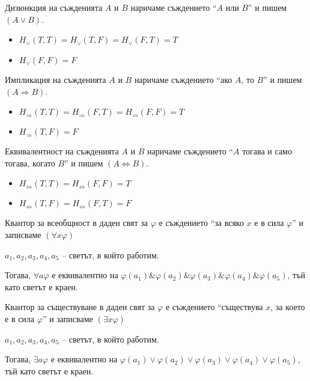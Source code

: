 \documentclass{article}
\begin{document}
\begin{mydef}[Дизюнкция]
Дизюнкция на съжденията $A$ и $B$ наричаме съждението  ``$A$ или $B$'' и пишем $(A \lor B)$.

\begin{itemize}
\item $H_\lor(T,T) = H_\lor(T,F) = H_\lor(F, T) = T$
\item $H_\lor(F,F) = F$
\end{itemize}
\end{mydef}

\begin{mydef}[Импликация]
Импликация на съжденията $A$ и $B$ наричаме съждението  ``ако $A$, то $B$'' и пишем $(A \Rightarrow B)$.

\begin{itemize}
\item $H_\Rightarrow(T,T) = H_\Rightarrow(F,T) = H_\Rightarrow(F, F) = T$
\item $H_\Rightarrow(T,F) = F$
\end{itemize}

\end{mydef}

\begin{mydef}[Еквивалентност]
Еквивалентност на съжденията $A$ и $B$ наричаме съждението  ``$A$ тогава и само тогава, когато $B$'' и пишем $(A \Leftrightarrow B)$.

\begin{itemize}
\item $H_\Leftrightarrow(T,T) = H_\Leftrightarrow(F,F) = T$
\item $H_\Leftrightarrow(T,F) = H_\Leftrightarrow(F,T) = F$
\end{itemize}
\end{mydef}

\begin{mydef}
Квантор за всеобщност в даден свят за $\varphi$ е съждението ``за всяко $x$ е в сила $\varphi$'' и записваме $(\forall x \varphi)$

\begin{example}
$a_1, a_2, a_3, a_4, a_5$ -- светът, в който работим.

Тогава, $\forall a \varphi$ е еквивалентно на $\varphi(a_1) \& \varphi(a_2) \& \varphi(a_3) \& \varphi(a_4) \& \varphi(a_5)$, тъй като светът е краен.
\end{example}
\end{mydef}

\begin{mydef}
Квантор за съществуване в даден свят за $\varphi$ е съждението ``съществува $x$, за което е в сила $\varphi$'' и записваме $(\exists x \varphi)$

\begin{example}
$a_1, a_2, a_3, a_4, a_5$ -- светът, в който работим.

Тогава, $\exists a \varphi$ е еквивалентно на $\varphi(a_1) \lor \varphi(a_2) \lor \varphi(a_3) \lor \varphi(a_4) \lor \varphi(a_5)$, тъй като светът е краен.
\end{example}
\end{mydef}
\end{document}
